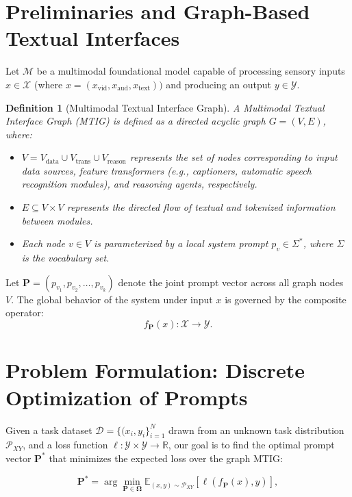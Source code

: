 \documentclass[11pt,a4paper]{article}
\newtheorem{definition}[theorem]{Definition}
\begin{document}
\section{Preliminaries and Graph-Based Textual Interfaces}
Let $\mathcal{M}$ be a multimodal foundational model capable of processing sensory inputs $x \in \mathcal{X}$ (where $x = (x_{\text{vid}}, x_{\text{aud}}, x_{\text{text}}))$ and producing an output $y \in \mathcal{Y}$. 

\begin{definition}[Multimodal Textual Interface Graph]
A Multimodal Textual Interface Graph (MTIG) is defined as a directed acyclic graph $G = (V, E)$, where:
\begin{itemize}
    \item $V = V_{\text{data}} \cup V_{\text{trans}} \cup V_{\text{reason}}$ represents the set of nodes corresponding to input data sources, feature transformers (e.g., captioners, automatic speech recognition modules), and reasoning agents, respectively.
    \item $E \subseteq V \times V$ represents the directed flow of textual and tokenized information between modules.
    \item Each node $v \in V$ is parameterized by a local system prompt $p_v \in \Sigma^*$, where $\Sigma$ is the vocabulary set.
\end{itemize}
\end{definition}

Let $\mathbf{P} = (p_{v_1}, p_{v_2}, \dots, p_{v_k})$ denote the joint prompt vector across all graph nodes $V$. The global behavior of the system under input $x$ is governed by the composite operator:
\begin{equation}
    f_{\mathbf{P}}(x) : \mathcal{X} \to \mathcal{Y}.
\end{equation}

\section{Problem Formulation: Discrete Optimization of Prompts}
Given a task dataset $\mathcal{D} = \{(x_i, y_i\}_{i=1}^N$ drawn from an unknown task distribution $\mathcal{P}_{XY}$, and a loss function $\ell : \mathcal{Y} \times \mathcal{Y} \to \mathbb{R}$, our goal is to find the optimal prompt vector $\mathbf{P}^*$ that minimizes the expected loss over the graph MTIG:

\begin{equation}
    \mathbf{P}^* = \arg\min_{\mathbf{P} \in \boldsymbol{\Omega}} \mathbb{E}_{(x,y) \sim \mathcal{P}_{XY}} \left[ \ell(f_{\mathbf{P}}(x), y) \right],
\end{equation}
\end{document}
